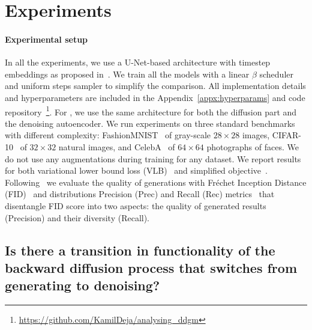 \section{Experiments}


\paragraph{Experimental setup} In all the experiments, we use a U-Net-based architecture with timestep embeddings as proposed in~\citet{ho2020denoising,nichol2021improved}. We train all the models with a linear $\beta$ scheduler and uniform steps sampler to simplify the comparison. All implementation details and hyperparameters are included in the Appendix~\ref{appx:hyperparams} and code repository~\footnote{\url{https://github.com/KamilDeja/analysing_ddgm}}. 
For \ours{}, we use the same architecture for both the diffusion part and the denoising autoencoder. 
We run experiments on three standard benchmarks with different complexity: FashionMNIST~\cite{xiao2017fashion} of gray-scale $28 \times 28$ images, CIFAR-10~\cite{Krizhevsky09learningmultiple} of $32 \times 32$ natural images, and CelebA~\cite{liu2015faceattributes} of $64 \times 64$ photographs of faces. We do not use any augmentations during training for any dataset. We report results for both variational lower bound loss (VLB)~\cite{sohl2015deep} and simplified objective~\cite{ho2020denoising}.
Following~\citet{nichol2021improved} we evaluate the quality of generations with Fréchet Inception Distance (FID)~\cite{heusel2017gans} and distributions Precision (Prec) and Recall (Rec) metrics~\cite{sajjadi2018assessing} that disentangle FID score into two aspects: the quality of generated results (Precision) and their diversity (Recall).

\subsection{Is there a transition in functionality of the backward diffusion process that switches from generating to denoising?}
\label{sect:reasonable_to_use_denoiser}



